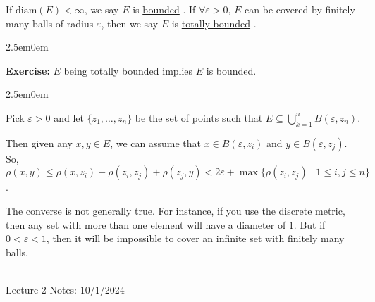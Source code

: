 \documentclass{book}
\newcommand{\exTwo}{%
   \color{Purple}%
   \fontsize{13}{15}\selectfont%
}
\newcommand{\exPP}{%
   \color{RedViolet}%
   \fontsize{12}{14}\selectfont%
}
\newenvironment{myIndent}{%
   \begin{adjustwidth}{2.5em}{0em}%
}{%
   \end{adjustwidth}%
}
\newcommand{\udefine}[1]{{%
   \setulcolor{Red}%
   \setul{0.14em}{0.07em}%
   \ul{#1}%
}}
\newcommand{\blab}[1]{\textbf{#1}}
\newcommand{\diam}{\mathrm{diam}}
\newcommand{\mySepTwo}[1][.]{%
   {\noindent\color{#1}{\rule{6.5in}{0.5mm}}}\\%
}
\newcommand{\retTwo}{\hfill\bigbreak}
\newcommand{\mHeader}[1]{{
   \color{Black}%
   \fontsize{20}{18}\selectfont%
   #1\retTwo
}}
\begin{document}
If $\diam(E) < \infty$, we say $E$ is \udefine{bounded}. If $\forall \varepsilon > 0$, $E$ can be covered by finitely many balls of radius $\varepsilon$, then we say $E$ is \udefine{totally bounded}.\newpage

\begin{myIndent}\exTwo
	\blab{Exercise:} $E$ being totally bounded implies $E$ is bounded.
	\begin{myIndent}\exPP
		Pick $\varepsilon > 0$ and let $\{z_1, \ldots, z_n\}$ be the set of points such that $E \subseteq \bigcup\limits_{k = 1}^n B(\varepsilon, z_n)$.\retTwo

		Then given any $x, y \in E$, we can assume that $x \in B(\varepsilon, z_i)$ and $y \in B(\varepsilon, z_j)$. So, $\rho(x, y) \leq \rho(x, z_i) + \rho(z_i, z_j) + \rho(z_j, y) < 2\varepsilon + \max\{\rho(z_i, z_j) \mid 1 \leq i, j \leq n\}$.\retTwo
	\end{myIndent}

	The converse is not generally true. For instance, if you use the discrete metric, then any set with more than one element will have a diameter of $1$. But if $0 < \varepsilon < 1$, then it will be impossible to cover an infinite set with finitely many balls.\retTwo
\end{myIndent}

\mySepTwo

\mHeader{Lecture 2 Notes: 10/1/2024}
\end{document}
